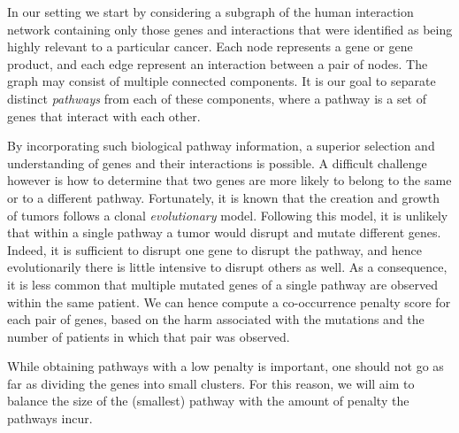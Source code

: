\documentclass[conference]{IEEEtran}
\begin{document}
In our setting we start by considering a subgraph of the human interaction network containing only those genes and interactions that were identified as being highly relevant to a particular cancer. Each node represents a gene or gene product, and each edge represent an interaction between a pair of nodes. The graph may consist of multiple connected components. It is our goal to separate distinct \textit{pathways} from each of these components, where a pathway is a set of genes that interact with each other.

By incorporating such biological pathway information, a superior selection and understanding of genes and their interactions is possible. %
%
A difficult challenge however is how to determine that two genes are more likely to belong to the same or to a different pathway. Fortunately, it is known that the creation and growth of tumors follows a clonal \textit{evolutionary} model. Following this model, it is unlikely that within a single pathway a tumor would disrupt and mutate different genes. Indeed, it is sufficient to disrupt one gene to disrupt the pathway, and hence evolutionarily there is little intensive to disrupt others as well. As a consequence, it is less common that multiple mutated genes of a single pathway are observed within the same patient. We can hence compute a co-occurrence penalty score for each pair of genes, based on the harm associated with the mutations and the number of patients in which that pair was observed.

While obtaining pathways with a low penalty is important, one should not go as far as dividing the genes into small clusters. For this reason, we will aim to balance the size of the (smallest) pathway with the amount of penalty the pathways incur.
\end{document}
